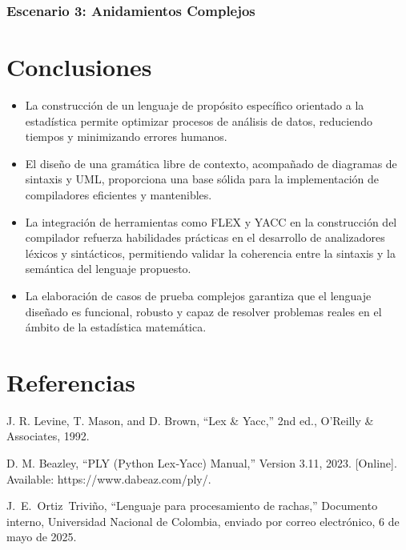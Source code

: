 \documentclass{article}
\begin{document}
\subsubsection{Escenario 3:  Anidamientos Complejos }



\section{Conclusiones}

\begin{itemize}
    \item La construcción de un lenguaje de propósito específico orientado a la estadística permite optimizar procesos de análisis de datos, reduciendo tiempos y minimizando errores humanos.
    
    \item El diseño de una gramática libre de contexto, acompañado de diagramas de sintaxis y UML, proporciona una base sólida para la implementación de compiladores eficientes y mantenibles.
    
    \item La integración de herramientas como FLEX y YACC en la construcción del compilador refuerza habilidades prácticas en el desarrollo de analizadores léxicos y sintácticos, permitiendo validar la coherencia entre la sintaxis y la semántica del lenguaje propuesto.
    
    \item La elaboración de casos de prueba complejos garantiza que el lenguaje diseñado es funcional, robusto y capaz de resolver problemas reales en el ámbito de la estadística matemática.
\end{itemize}


\section{Referencias}
\renewcommand{\refname}{}

\begin{thebibliography}{9}


 \label{ref:lexPy1} J. R. Levine, T. Mason, and D. 
Brown, “Lex \& Yacc,” 2nd ed., O’Reilly \& Associates, 1992.

 \label{ref:lexPy2}  D. M. Beazley, “PLY (Python Lex‐Yacc)
Manual,” Version 3.11, 2023. [Online]. Available: https://www.dabeaz.com/ply/.

 \label{ref:rachas} J.~E.~Ortiz~Triviño, ``Lenguaje para 
  procesamiento de rachas,'' Documento interno, Universidad Nacional de 
    Colombia, enviado por correo electrónico, 6 de mayo de 2025.

\end{thebibliography}
\end{document}
